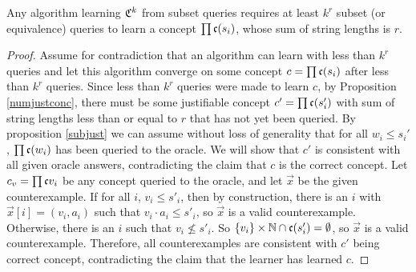 \documentclass[11pt]{amsart}
\begin{document}
\begin{theorem}
Any algorithm learning $\mathfrak{C}^k$ from subset queries requires at least $k^r$ subset (or equivalence) queries to learn a concept $\prod \mathfrak{c}(s_i)$, whose sum of string lengths is $r$.
\end{theorem}
\begin{proof}
Assume for contradiction that an algorithm can learn with less than $k^r$ queries and let this algorithm converge on some concept $c = \prod \mathfrak{c}(s_i)$ after less than $k^r$ queries. 
Since less than $k^r$ queries were made to learn $c$, by Proposition \ref{numjustconc}, there must be some justifiable concept $c' = \prod \mathfrak{c}(s'_i)$ with sum of string lengths less than or equal to $r$ that has not yet been queried.
By proposition \ref{subjust} we can assume without loss of generality that for all $w_i \le s_i'$, $\prod \mathfrak{c}(w_i)$ has been queried to the oracle.
We will show that $c'$ is consistent with all given oracle answers, contradicting the claim that $c$ is the correct concept. 
Let $c_v = \prod \mathfrak{c}{v_i}$ be any concept queried to the oracle, and let $\vec{x}$ be the given counterexample.
If for all $i$, $v_i \le s'_i$, then by construction, there is an $i$ with $\vec{x}[i] = (v_i, a_i)$ such that $v_i \cdot a_i \le s'_i$, so $\vec{x}$ is a valid counterexample.
Otherwise, there is an $i$ such that $v_i \not\le s'_i$. 
So $\{v_i\} \times \mathbb{N}  \cap \mathfrak{c}(s'_i) = \emptyset$, so $\vec{x}$ is a valid counterexample. 
Therefore, all counterexamples are consistent with $c'$ being correct concept, contradicting the claim that the learner has learned $c$. 
\end{proof}
\end{document}
